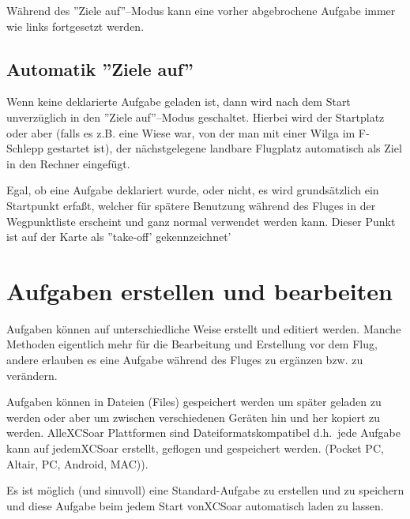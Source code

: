 Während des ''Ziele auf''--Modus  kann eine vorher abgebrochene Aufgabe immer wie links fortgesetzt werden.

\subsection{Automatik ''Ziele auf''}

Wenn keine deklarierte Aufgabe geladen ist, dann wird nach dem Start unverzüglich in den ''Ziele auf''--Modus geschaltet. Hierbei wird der Startplatz oder aber (falls es z.B. eine Wiese war, von der man mit einer Wilga im F-Schlepp gestartet ist), der nächstgelegene landbare Flugplatz automatisch als Ziel in den Rechner eingefügt.

Egal, ob eine Aufgabe deklariert wurde, oder nicht, es wird grundsätzlich ein Startpunkt erfaßt, welcher für spätere Benutzung während des Fluges in der Wegpunktliste erscheint und ganz normal  verwendet werden kann. 
Dieser Punkt ist auf der Karte als ''take-off' gekennzeichnet' 

\section{Aufgaben erstellen und bearbeiten}

Aufgaben können auf unterschiedliche Weise erstellt und editiert  werden. Manche Methoden eigentlich mehr für die Bearbeitung und Erstellung vor dem Flug,  andere erlauben es eine Aufgabe während des Fluges zu ergänzen bzw. zu verändern.

Aufgaben können in Dateien (Files) gespeichert werden um später geladen zu werden oder aber um zwischen verschiedenen Geräten hin und her kopiert zu werden. Alle\textsf{XCSoar} Plattformen sind Dateiformatskompatibel d.h.\  jede Aufgabe kann auf jedem\textsf{XCSoar} erstellt, geflogen und gespeichert werden. (\textsf{Pocket PC, Altair, PC, Android, MAC)}).

\tip Es ist möglich (und sinnvoll) eine Standard-Aufgabe zu erstellen und zu speichern und diese  Aufgabe beim jedem Start von\textsf{XCSoar} automatisch laden zu lassen.

